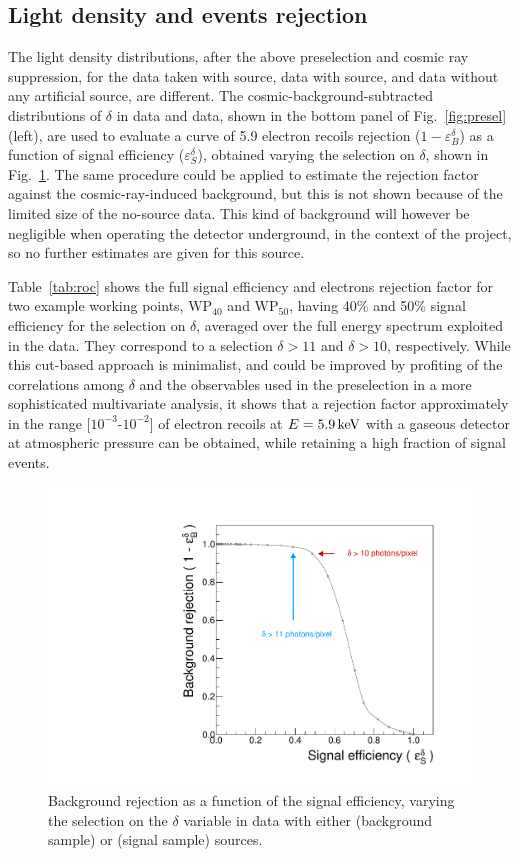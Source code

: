 \subsection{Light density and  \fe events rejection}
The light density distributions, after the above preselection and
cosmic ray suppression, for the data taken with \ambe source, data
with \fe source, and data without any artificial source, are
different.  The cosmic-background-subtracted distributions of $\delta$
in \ambe data and \fe data, shown in the bottom panel of
Fig.~\ref{fig:presel} (left), are used to evaluate a curve of 5.9\keV
electron recoils rejection ($1-\varepsilon^\delta_{B}$) as a function
of signal efficiency ($\varepsilon^\delta_{S}$), obtained varying the
selection on $\delta$, shown in Fig.~\ref{fig:roc}.  The same
procedure could be applied to estimate the rejection factor against
the cosmic-ray-induced background, but this is not shown because of
the limited size of the no-source data. This kind of background will
however be negligible when operating the detector underground, in the
context of the \cygno project, so no further estimates are given for
this source.

Table~\ref{tab:roc} shows the full signal efficiency and electrons
rejection factor for two example working points, $\mathrm{WP}_{40}$
and $\mathrm{WP}_{50}$, having 40\% and 50\% signal efficiency for the
selection on $\delta$, averaged over the full energy spectrum
exploited in the \ambe data. They correspond to a selection
$\delta>11$ and $\delta>10$, respectively.  While this cut-based
approach is minimalist, and could be improved by profiting of the
correlations among $\delta$ and the observables used in the
preselection in a more sophisticated multivariate analysis, it shows
that a rejection factor approximately in the range
[$10^{-3}$-$10^{-2}$] of electron recoils at $E=5.9\,\textrm{ke\hspace{-.08em}V}$ with a
gaseous detector at atmospheric pressure can be obtained, while
retaining a high fraction of signal events.
%
\begin{figure}[ht]
  \begin{center}
  \includegraphics[width=0.45\linewidth]{figures/density_roc}

  \caption{Background rejection as a function of the signal
    efficiency, varying the selection on the $\delta$ variable in data
    with either \fe (background sample) or \ambe (signal sample)
    sources.  \label{fig:roc}}

  \end{center}
\end{figure}
%



